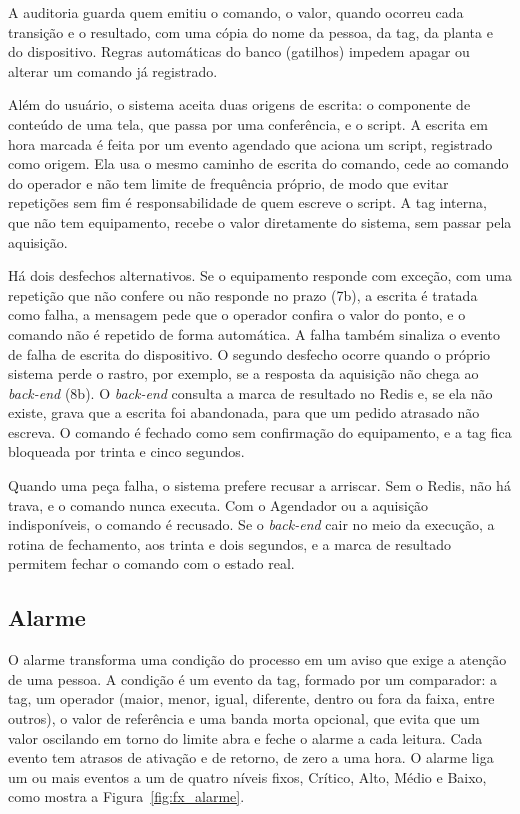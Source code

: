 \par A auditoria guarda quem emitiu o comando, o valor, quando ocorreu cada transição e o resultado, com uma cópia do nome da pessoa, da tag, da planta e do dispositivo. Regras automáticas do banco (gatilhos) impedem apagar ou alterar um comando já registrado.

\par Além do usuário, o sistema aceita duas origens de escrita: o componente de conteúdo de uma tela, que passa por uma conferência, e o script. A escrita em hora marcada é feita por um evento agendado que aciona um script, registrado como origem. Ela usa o mesmo caminho de escrita do comando, cede ao comando do operador e não tem limite de frequência próprio, de modo que evitar repetições sem fim é responsabilidade de quem escreve o script. A tag interna, que não tem equipamento, recebe o valor diretamente do sistema, sem passar pela aquisição.

\par Há dois desfechos alternativos. Se o equipamento responde com exceção, com uma repetição que não confere ou não responde no prazo (7b), a escrita é tratada como falha, a mensagem pede que o operador confira o valor do ponto, e o comando não é repetido de forma automática. A falha também sinaliza o evento de falha de escrita do dispositivo. O segundo desfecho ocorre quando o próprio sistema perde o rastro, por exemplo, se a resposta da aquisição não chega ao \emph{back-end} (8b). O \emph{back-end} consulta a marca de resultado no Redis e, se ela não existe, grava que a escrita foi abandonada, para que um pedido atrasado não escreva. O comando é fechado como sem confirmação do equipamento, e a tag fica bloqueada por trinta e cinco segundos.

\par Quando uma peça falha, o sistema prefere recusar a arriscar. Sem o Redis, não há trava, e o comando nunca executa. Com o Agendador ou a aquisição indisponíveis, o comando é recusado. Se o \emph{back-end} cair no meio da execução, a rotina de fechamento, aos trinta e dois segundos, e a marca de resultado permitem fechar o comando com o estado real.

\subsection{Alarme}

\par O alarme transforma uma condição do processo em um aviso que exige a atenção de uma pessoa. A condição é um evento da tag, formado por um comparador: a tag, um operador (maior, menor, igual, diferente, dentro ou fora da faixa, entre outros), o valor de referência e uma banda morta opcional, que evita que um valor oscilando em torno do limite abra e feche o alarme a cada leitura. Cada evento tem atrasos de ativação e de retorno, de zero a uma hora. O alarme liga um ou mais eventos a um de quatro níveis fixos, Crítico, Alto, Médio e Baixo, como mostra a Figura~\ref{fig:fx_alarme}.

